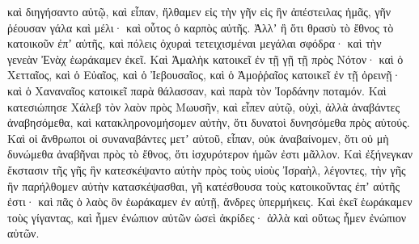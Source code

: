 {καὶ διηγήσαντο αὐτῷ, καὶ εἶπαν, ἤλθαμεν εἰς τὴν γῆν εἰς ἣν ἀπέστειλας ἡμᾶς, γῆν ῥέουσαν γάλα καὶ μέλι· καὶ οὗτος ὁ καρπὸς αὐτῆς.
Ἀλλʼ ἢ ὅτι θρασὺ τὸ ἔθνος τὸ κατοικοῦν ἐπʼ αὐτῆς, καὶ πόλεις ὀχυραὶ τετειχισμέναι μεγάλαι σφόδρα· καὶ τὴν γενεὰν Ἐνὰχ ἑωράκαμεν ἐκεῖ.
Καὶ Ἀμαλὴκ κατοικεῖ ἐν τῇ γῇ τῇ πρὸς Νότον· καὶ ὁ Χετταῖος, καὶ ὁ Εὐαῖος, καὶ ὁ Ἰεβουσαῖος, καὶ ὁ Ἀμοῤῥαῖος κατοικεῖ ἐν τῇ ὀρεινῇ· καὶ ὁ Χαναναῖος κατοικεῖ παρὰ θάλασσαν, καὶ παρὰ τὸν Ἰορδάνην ποταμόν.
Καὶ κατεσιώπησε Χάλεβ τὸν λαὸν πρὸς Μωυσῆν, καὶ εἶπεν αὐτῷ, οὐχὶ, ἀλλὰ ἀναβάντες ἀναβησόμεθα, καὶ κατακληρονομήσομεν αὐτὴν, ὅτι δυνατοὶ δυνησόμεθα πρὸς αὐτούς.
Καὶ οἱ ἄνθρωποι οἱ συναναβάντες μετʼ αὐτοῦ, εἶπαν, οὐκ ἀναβαίνομεν, ὅτι οὐ μὴ δυνώμεθα ἀναβῆναι πρὸς τὸ ἔθνος, ὅτι ἰσχυρότερον ἡμῶν ἐστι μᾶλλον.
Καὶ ἐξήνεγκαν ἔκστασιν τῆς γῆς ἣν κατεσκέψαντο αὐτὴν πρὸς τοὺς υἱοὺς Ἰσραὴλ, λέγοντες, τὴν γῆς ἣν παρήλθομεν αὐτὴν κατασκέψασθαι, γῆ κατέσθουσα τοὺς κατοικοῦντας ἐπʼ αὐτῆς ἐστι· καὶ πᾶς ὁ λαὸς ὃν ἑωράκαμεν ἐν αὐτῇ, ἄνδρες ὑπερμήκεις.
Καὶ ἐκεῖ ἑωράκαμεν τοὺς γίγαντας, καὶ ἦμεν ἐνώπιον αὐτῶν ὡσεὶ ἀκρίδες· ἀλλὰ καὶ οὕτως ἦμεν ἐνώπιον αὐτῶν.

}
